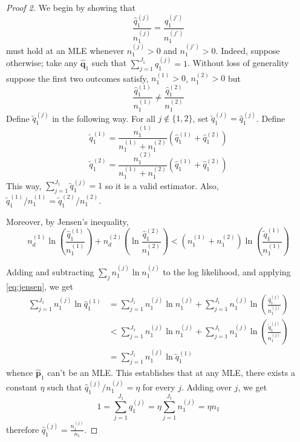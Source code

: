 \documentclass[11pt]{article} %
\begin{document}
\begin{proof}[Proof 2] We begin by showing that
  \[  \frac{\hat q_1^{(j)}}{n_1^{(j)}} = \frac{\hat q_1^{(j')}}{n_1^{(j')}} \]
  must hold at an MLE whenever $n_1^{(j)} >0$ and $n_1^{(j')} >0$.
  Indeed, suppose otherwise; take any $\hat{\mathbf q}_1$ such that
  $\sum_{j=1}^{J_1} q_1^{(j)} = 1$. Without loss of generality suppose the first
  two outcomes satisfy, $n_1^{(1)} > 0$, $n_1^{(2)}>0$ but
  \[\frac{\hat q_1^{(1)}}{n_1^{(1)}} \ne \frac{\hat q_1^{(2)}}{n_1^{(2)}}\]
  Define $\tilde q_1^{(j)}$ in the following way. For all $j \notin \{1,2\}$,
  set $\tilde q_1^{(j)} = \hat q_1^{(j)}$.  Define
  \[  \tilde q_1^{(1)} = \frac{n_1^{(1)}}{n_1^{(1)}+ n_1^{(2)}} \left(\hat q_1^{(1)} + \hat q_1^{(2)}\right)\]
  \[  \tilde q_1^{(2)} = \frac{n_1^{(2)}}{n_1^{(1)}+ n_1^{(2)}} \left(\hat q_1^{(1)} + \hat q_1^{(2)}\right)\]
  This way, $\sum_{j=1}^{J_1} \tilde q_1^{(j)} = 1$ so it is a valid estimator.
  Also, $\tilde q_1^{(1)} / n_1^{(1)} = \tilde q_1^{(2)}/n_1^{(2)}$.

  Moreover, by Jensen's inequality,
  \begin{equation}
    \label{eq:jensen}
    n_d^{(1)} \ln \left(\frac{\hat q_1^{(1)}}{n_1^{(1)}}\right) + n_d^{(2)} \left(\ln
      \frac{\hat q_1^{(2)} }{n_1^{(2)}}\right) < (n_1^{(1)} + n_1^{(2)}) \ln \left(
      \frac{\tilde q_1^{(1)}}{n_1^{(1)}}  \right)     
  \end{equation}

  Adding and subtracting $\sum_j n_1^{(j)}\ln n_1^{(j)}$ to the log likelihood,
  and applying \eqref{eq:jensen}, we get
  \[  \begin{aligned} \sum_{j=1}^{J_1} n_1^{(j)} \ln \hat q_1^{(1)} &= \sum_{j=1}^{J_1}
    n_1^{(j)} \ln n_1^{(j)} + \sum_{j=1}^{J_1} n_1^{(j)} \ln \left( \frac{\hat
        q_1^{(j)}}{n_1^{(j)}} \right) \\
    & < \sum_{j=1}^{J_1}
    n_1^{(j)} \ln n_1^{(j)} + \sum_{j=1}^{J_1} n_1^{(j)} \ln \left( \frac{\tilde
        q_1^{(j)}}{n_1^{(j)}} \right)\\
    &= \sum_{j=1}^{J_1} n_1^{(j)} \ln \tilde q_1^{(1)}
  \end{aligned}\]
  whence $\hat{\mathbf p}_1$ can't be an MLE. This establishes that at any MLE,
  there exists a constant $\eta$ such that $\hat q_1^{(j)} / n_1^{(j)}= \eta$ for every
  $j$. Adding over $j$, we get
  \[  1 = \sum_{j=1}^{J_1} \hat q_1^{(j)} = \eta \sum_{j=1}^{J_1} n_1^{(j)} = \eta n_1 \]
  therefore $\hat q_1^{(j)} = \frac{n_1^{(j)}}{n_1}$.
\end{proof}
\end{document}
